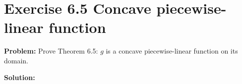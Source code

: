 \section{Exercise 6.5 Concave piecewise-linear function}
\textbf{Problem:} Prove Theorem 6.5: $g$ is a concave piecewise-linear function on its domain.

\textbf{Solution:} 